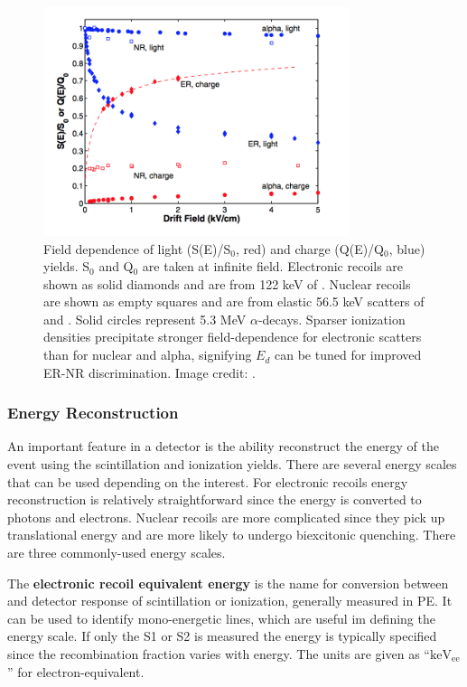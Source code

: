 \begin{figure}
\centering
\includegraphics[width=0.8\textwidth]{LYQY}
\caption{Field dependence of light (S(E)/S$_{0}$, red) and charge (Q(E)/Q$_{0}$, blue) yields.  S$_{0}$ and Q$_{0}$ are taken at
infinite field.  Electronic recoils are shown as solid diamonds and are from 122 keV \gammarays of .  Nuclear recoils
are shown as empty squares and are from elastic 56.5 keV scatters of \ambe and .  Solid circles represent 
5.3 MeV $\alpha$-decays.  Sparser ionization densities precipitate stronger field-dependence for electronic scatters than for nuclear and
alpha, signifying $E_{d}$ can be tuned for improved ER-NR discrimination.  Image credit: .}
\label{fig:tpcs_signals_drift_field}
\end{figure}



\subsubsection{Energy Reconstruction}
\label{subsubsec:tpcs_signals_energy}
An important feature in a detector is the ability reconstruct the energy of the event using the scintillation and
ionization yields.  There are several energy scales that can be used depending on the interest.  For electronic recoils energy
reconstruction is relatively straightforward since the energy is converted to photons and electrons.  Nuclear recoils are more
complicated since they pick up translational energy and are more likely to undergo biexcitonic quenching.  There are three commonly-used
energy scales.

The \textbf{electronic recoil equivalent energy} is the name for conversion between \gammaray and detector response of scintillation or
ionization, generally measured in PE.  It can be used to identify mono-energetic \gamma lines, which are useful im defining the energy
scale.  If only the S1 or S2 is measured the energy is typically specified since the recombination fraction varies with energy.  The units
are given as ``$\mathrm{keV_{ee}}$'' for electron-equivalent.

